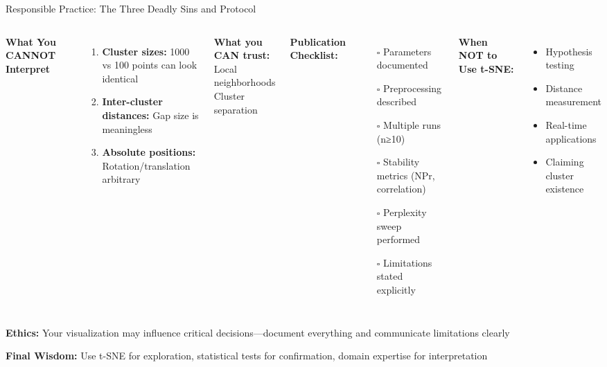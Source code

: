 \documentclass[aspectratio=169]{beamer}
\newcommand{\ethics}[1]{\colorbox{purple!10}{\textcolor{ethicscolor}{\textbf{Ethics:} #1}}}
\begin{document}
\begin{frame}{Responsible Practice: The Three Deadly Sins and Protocol}
\begin{columns}
\begin{center}
\colorbox{red!30}{\textbf{What You CANNOT Interpret}}
\end{center}

\begin{enumerate}
\item \textbf{Cluster sizes:} 1000 vs 100 points can look identical
\item \textbf{Inter-cluster distances:} Gap size is meaningless
\item \textbf{Absolute positions:} Rotation/translation arbitrary
\end{enumerate}

\vspace{0.3cm}
\colorbox{green!30}{\parbox{0.9\columnwidth}{\centering\textbf{What you CAN trust:}\\Local neighborhoods\\Cluster separation}}

\textbf{Publication Checklist:}
\begin{itemize}
\item[$\square$] Parameters documented
\item[$\square$] Preprocessing described
\item[$\square$] Multiple runs (n≥10)
\item[$\square$] Stability metrics (NPr, correlation)
\item[$\square$] Perplexity sweep performed
\item[$\square$] Limitations stated explicitly
\end{itemize}

\vspace{0.3cm}
\textbf{When NOT to Use t-SNE:}
\begin{itemize}
\item Hypothesis testing
\item Distance measurement
\item Real-time applications
\item Claiming cluster existence
\end{itemize}
\end{columns}

\vspace{0.3cm}
\ethics{Your visualization may influence critical decisions—document everything and communicate limitations clearly}

\vspace{0.2cm}
\colorbox{yellow!20}{\parbox{0.95\textwidth}{\centering\textbf{Final Wisdom:} Use t-SNE for exploration, statistical tests for confirmation, domain expertise for interpretation}}
\end{frame}
\end{document}
